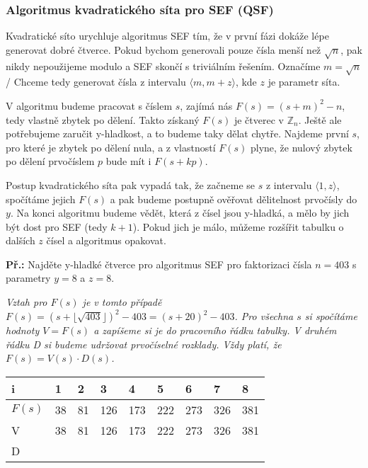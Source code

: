\documentclass[10pt,a4paper]{article}
\begin{document}
\subsubsection{Algoritmus kvadratického síta pro SEF (QSF)}
Kvadratické síto urychluje algoritmus SEF tím, že v první fázi dokáže lépe generovat dobré čtverce. Pokud bychom generovali pouze čísla menší než $\sqrt{n}$, pak nikdy nepoužijeme modulo a SEF skončí s triviálním řešením. Označíme $m = \sqrt{n}$/ Chceme tedy generovat čísla z intervalu $\langle m, m + z \rangle$, kde $z$ je parametr síta. 

V algoritmu budeme pracovat s číslem $s$, zajímá nás $F(s) = (s + m)^2 - n$, tedy vlastně zbytek po dělení. Takto získaný $F(s)$ je čtverec v $\mathbb{Z}_n$. Ještě ale potřebujeme zaručit y-hladkost, a to budeme taky dělat chytře. Najdeme první $s$, pro které je zbytek po dělení nula, a z vlastností $F(s)$ plyne, že nulový zbytek po dělení prvočíslem $p$ bude mít i $F(s + kp)$.

Postup kvadratického síta pak vypadá tak, že začneme se $s$ z intervalu $\langle 1, z\rangle$, spočítáme jejich $F(s)$ a pak budeme postupně ověřovat dělitelnost prvočísly do $y$. Na konci algoritmu budeme vědět, která z čísel jsou y-hladká, a mělo by jich být dost pro SEF (tedy $k+1$). Pokud jich je málo, můžeme rozšířit tabulku o dalších $z$ čísel a algoritmus opakovat.

\textbf{Př.:} Najděte y-hladké čtverce pro algoritmus SEF pro faktorizaci čísla $n=403$ s parametry $y = 8$ a $z=8$.

\textit{Vztah pro $F(s)$ je v tomto případě $F(s) = (s +\lfloor \sqrt{403} \rfloor)^2 - 403= (s + 20)^2 - 403$. Pro všechna $s$ si spočítáme hodnoty $V = F(s)$ a zapíšeme si je do pracovního řádku tabulky. V druhém řádku D si budeme udržovat prvočíselné rozklady. Vždy platí, že $F(s) = V(s) \cdot D(s)$.}

\begin{table}[h!]
\centering
\begin{tabular}{|p{1cm}|p{1cm}|p{1cm}|p{1cm}|p{1cm}|p{1cm}|p{1cm}|p{1cm}|p{1cm}|}
\hline
i & 1 & 2 &3 & 4 & 5 & 6 & 7 & 8\\
\hline
\hline
$F(s)$ & 38 & 81 & 126 & 173 & 222 & 273 & 326 & 381\\
\hline
V & 38 & 81 & 126 & 173 & 222 & 273 & 326 & 381\\
\hline
D &  &   &  &   &   &  &   &  \\
\hline
\end{tabular}
\end{table}
\end{document}
